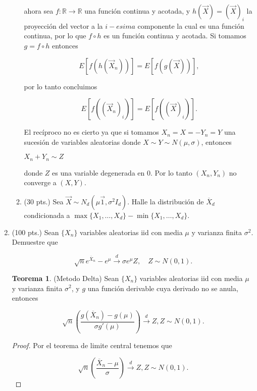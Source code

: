 \documentclass[letterpaper]{article}
\theoremstyle{definition}
\theoremstyle{lemathm}
\theoremstyle{lemathm}
\newtheorem{theo}{Teorema}
\theoremstyle{lemademthm}
\newcommand{\pars}[1]{\left( #1 \right) }
\newcommand{\bracs}[1]{\left[ #1 \right] }
\newcommand{\R}{\mathbb{R}}
\newcommand{\1}{\mathbbm{1}}
\begin{document}
\begin{enumerate}
\begin{enumerate}
			ahora sea $f:\R\to\R$ una función continua y acotada, y $h(\vec{X}) = \pars{\vec{X}}_i$ la proyección del vector a la $i-esima$ componente la cual es una función continua, por lo que $f\circ h$ es un función continua y acotada. Si tomamos $g=f\circ h$ entonces

			\[E\bracs{f\pars{h\pars{\vec{X}_n}}} = E\bracs{f\pars{g\pars{\vec{X}}}},\]

			por lo tanto concluimos

			\[E\bracs{f\pars{\pars{\vec{X}_n}_i}} = E\bracs{f\pars{\pars{\vec{X}}_i}}.\]

			El recíproco no es cierto ya que si tomamos $X_n = X = -Y_n = Y$ una sucesión de variables aleatorias donde $X \sim Y \sim N(\mu,\sigma)$, entonces 

			$X_n + Y_n \sim Z$
			
			donde $Z$ es una variable degenerada en 0. Por lo tanto $(X_n,Y_n)$ no converge a $(X,Y)$.

			\newpage

			\item (30 pts.) Sea $\vec{X}\sim N_d(\mu \vec{1},\sigma^2 I_d)$. Halle la distribución de $\overline{X}_d$ condicionada a $\max\{X_1,\dots,X_d\}-\min\{X_1,\dots,X_d\}$.
			

		\end{enumerate}

		\newpage

		\item (100 pts.) Sean $\{X_n\}$ variables aleatorias iid con media $\mu$ y varianza finita $\sigma^2$. Demuestre que 
		
		\[\sqrt{n} e^{\overline{X}_n}-e^\mu \overset{d}{\to} \sigma e^\mu Z,\quad Z\sim N(0,1).\]

		\begin{theo}
			
			(Metodo Delta) Sean $\{X_n\}$ variables aleatorias iid con media $\mu$ y varianza finita $\sigma^2$, y $g$ una función derivable cuya derivado no se anula, entonces
			
			\[\sqrt{n} \pars{\frac{g\pars{\overline{X}_n} - g\pars{\mu}}{\sigma g'(\mu)}} \xrightarrow{d} Z, Z \sim N(0,1).\]
		
		\end{theo}
		
		\begin{proof}
			Por el teorema de limite central tenemos que

			\[\sqrt{n} \pars{\frac{\overline{X}_n - \mu}{\sigma}} \xrightarrow{d} Z, Z \sim N(0,1).\]


\end{proof}
\end{enumerate}
\end{document}
